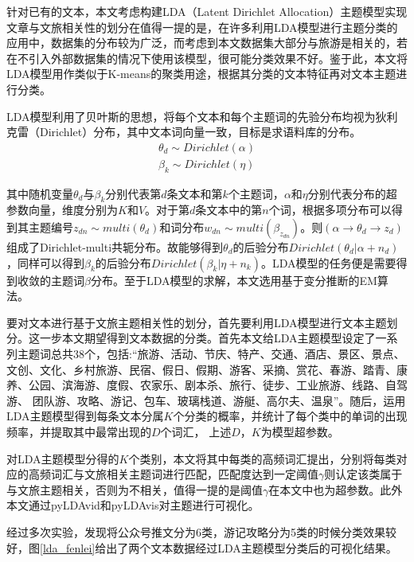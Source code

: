 \documentclass[bwprint]{gmcmthesis}
\begin{document}
针对已有的文本，本文考虑构建LDA（Latent Dirichlet Allocation）主题模型实现文章与文旅相关性的划分在值得一提的是，在许多利用LDA模型进行主题分类的应用中，数据集的分布较为广泛，而考虑到本文数据集大部分与旅游是相关的，若在不引入外部数据集的情况下使用该模型，很可能分类效果不好。鉴于此，本文将LDA模型用作类似于K-means的聚类用途，根据其分类的文本特征再对文本主题进行分类。

LDA模型利用了贝叶斯的思想，将每个文本和每个主题词的先验分布均视为狄利克雷（Dirichlet）分布，其中文本词向量一致，目标是求语料库的分布。
\begin{gather}
	\theta_d \sim Dirichlet(\alpha) \\
	\beta_k \sim Dirichlet(\eta)
\end{gather}


其中随机变量$\theta_d$与$\beta_k$分别代表第$d$条文本和第$k$个主题词，$\alpha$和$\eta$分别代表分布的超参数向量，维度分别为$K$和$V$。对于第$d$条文本中的第$n$个词，根据多项分布可以得到其主题编号$z_{dn} \sim multi(\theta_d)$和词分布$w_{dn} \sim multi(\beta_{z_{dn}})$。则$(\alpha \rightarrow \theta_d \rightarrow z_d)$组成了Dirichlet-multi共轭分布。故能够得到$\theta_d$的后验分布$Dirichlet(\theta_d|\alpha + n_d)$，同样可以得到$\beta_k$的后验分布$Dirichlet(\beta_k|\eta + n_k)$。LDA模型的任务便是需要得到收敛的主题词$\beta$分布。至于LDA模型的求解，本文选用基于变分推断的EM算法。

要对文本进行基于文旅主题相关性的划分，首先要利用LDA模型进行文本主题划分。这一步本文期望得到文本数据的分类。首先本文给LDA主题模型设定了一系列主题词总共38个，包括:“旅游、活动、节庆、特产、交通、酒店、景区、景点、文创、文化、乡村旅游、民宿、假日、假期、游客、采摘、赏花、春游、踏青、康养、公园、滨海游、度假、农家乐、剧本杀、旅行、徒步、工业旅游、线路、自驾游、 团队游、攻略、游记、包车、玻璃栈道、游艇、高尔夫、温泉”。随后，运用LDA主题模型得到每条文本分属$K$个分类的概率，并统计了每个类中的单词的出现频率，并提取其中最常出现的$D$个词汇， 上述$D$，$K$为模型超参数。

对LDA主题模型分得的$K$个类别，本文将其中每类的高频词汇提出，分别将每类对应的高频词汇与文旅相关主题词进行匹配，匹配度达到一定阈值$\gamma$则认定该类属于与文旅主题相关，否则为不相关，值得一提的是阈值$\gamma$在本文中也为超参数。此外本文通过pyLDAvid和pyLDAvis对主题进行可视化。

经过多次实验，发现将公众号推文分为6类，游记攻略分为5类的时候分类效果较好，图\ref{lda_fenlei}给出了两个文本数据经过LDA主题模型分类后的可视化结果。
\end{document}
